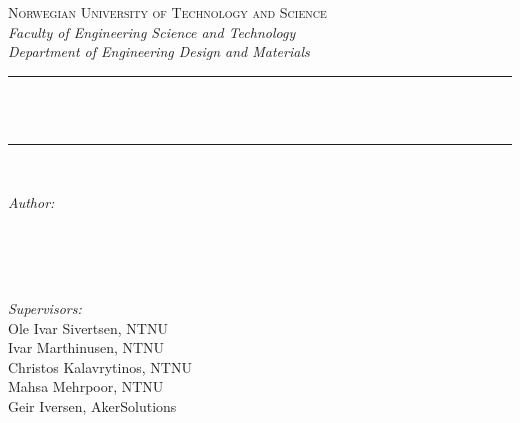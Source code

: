 \begin{titlepage}

\newcommand{\HRule}{\rule{\linewidth}{0.3mm}} %

\center

\textsc{\large Norwegian University of Technology and Science}\\[0.2cm] %
\slshape{\normalsize Faculty of Engineering Science and Technology}\\[0.1cm] %
\slshape{\normalsize Department of Engineering Design and Materials}\\[0.1cm] %


\HRule \\[0.4cm]
{ \LARGE \bfseries \textup{\mytitle }}\\[0.4cm] %
\HRule \\[1.5cm]


\begin{minipage}{0.4\textwidth}
\begin{flushleft} \small
\emph{Author:}\\
{\myauthorA} \\
{\myauthorB} \\
\phantom{A}
\end{flushleft}
\end{minipage}
~
\begin{minipage}{0.4\textwidth}
\begin{flushright} \small
\emph{Supervisors:} \\
Ole Ivar Sivertsen, NTNU \\%
Ivar Marthinusen, NTNU \\
Christos Kalavrytinos, NTNU \\
Mahsa Mehrpoor, NTNU \\
Geir Iversen, AkerSolutions \\
\end{flushright}
\end{minipage}\\[7cm]


\end{titlepage}
